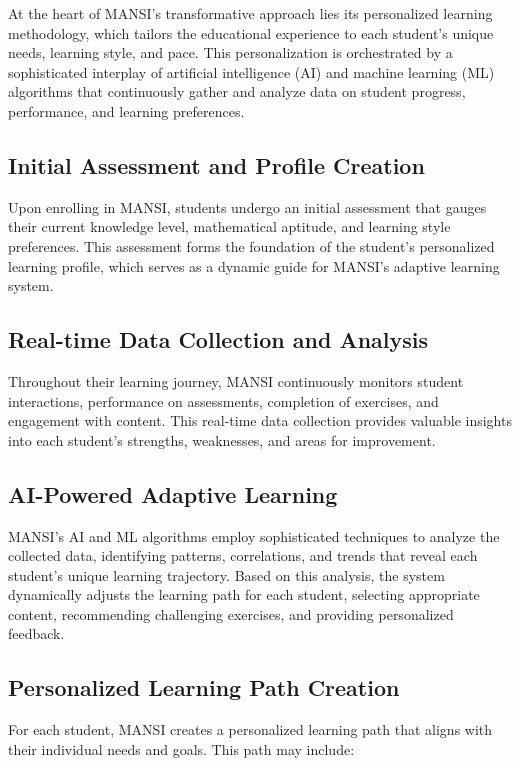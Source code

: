 \documentclass[20pt]{report}
\begin{document}
At the heart of MANSI's transformative approach lies its personalized learning methodology, which tailors the educational experience to each student's unique needs, learning style, and pace. This personalization is orchestrated by a sophisticated interplay of artificial intelligence (AI) and machine learning (ML) algorithms that continuously gather and analyze data on student progress, performance, and learning preferences.

\subsection{Initial Assessment and Profile Creation}

Upon enrolling in MANSI, students undergo an initial assessment that gauges their current knowledge level, mathematical aptitude, and learning style preferences. This assessment forms the foundation of the student's personalized learning profile, which serves as a dynamic guide for MANSI's adaptive learning system.

\subsection{Real-time Data Collection and Analysis}

Throughout their learning journey, MANSI continuously monitors student interactions, performance on assessments, completion of exercises, and engagement with content. This real-time data collection provides valuable insights into each student's strengths, weaknesses, and areas for improvement.

\subsection{AI-Powered Adaptive Learning}

MANSI's AI and ML algorithms employ sophisticated techniques to analyze the collected data, identifying patterns, correlations, and trends that reveal each student's unique learning trajectory. Based on this analysis, the system dynamically adjusts the learning path for each student, selecting appropriate content, recommending challenging exercises, and providing personalized feedback.

\subsection{Personalized Learning Path Creation}

For each student, MANSI creates a personalized learning path that aligns with their individual needs and goals. This path may include:
\end{document}
